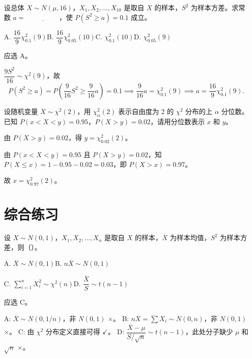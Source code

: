 \documentclass[lang=cn,11pt]{elegantbook}
\begin{document}
\begin{exercise}\label{exer:6-quantile-s2}
设总体 \(X \sim N(\mu, 16)\)，\(X_1, X_2, \dots, X_{10}\) 是取自 \(X\) 的样本，\(S^2\) 为样本方差。求常数 \(a =\,\underline{\hspace{2cm}}\)，使 \(P(S^2 \geq a) = 0.1\) 成立。\par
A. \(\dfrac{16}{9}\chi_{0.1}^2(9)\)\quad B. \(\dfrac{16}{9}\chi_{0.05}^2(10)\)\quad C. \(\chi_{0.1}^2(10)\)\quad D. \(\chi_{0.05}^2(9)\)
\end{exercise}

\begin{solution}
应选 A。

\(\dfrac{9S^2}{16} \sim \chi^2(9)\)，故
\[
P(S^2 \geq a) = P\!\left(\frac{9}{16}S^2 \geq \frac{9}{16}a\right) = 0.1 \implies \frac{9}{16}a = \chi_{0.1}^2(9) \implies a = \frac{16}{9}\chi_{0.1}^2(9).
\]
\end{solution}

\begin{exercise}\label{exer:6-quantile-range}
设随机变量 \(X \sim \chi^2(2)\)，用 \(\chi_\alpha^2(2)\) 表示自由度为 2 的 \(\chi^2\) 分布的上 \(\alpha\) 分位数。已知 \(P(x < X < y) = 0.95\)，\(P(X > y) = 0.02\)，请用分位数表示 \(x\) 和 \(y\)。
\end{exercise}

\begin{solution}
由 \(P(X > y) = 0.02\)，得 \(y = \chi_{0.02}^2(2)\)。

由 \(P(x < X < y) = 0.95\) 且 \(P(X > y) = 0.02\)，知 \(P(X \leq x) = 1 - 0.95 - 0.02 = 0.03\)，即 \(P(X > x) = 0.97\)。

故 \(x = \chi_{0.97}^2(2)\)。
\end{solution}


\section{综合练习}

\begin{exercise}\label{exer:6-multi-normal}
设 \(X \sim N(0,1)\)，\(X_1, X_2, \dots, X_n\) 是取自 \(X\) 的样本，\(\overline{X}\) 为样本均值，\(S^2\) 为样本方差，则（\quad）。\par
A. \(\overline{X} \sim N(0,1)\)\qquad B. \(n\overline{X} \sim N(0,1)\)\par
C. \(\displaystyle\sum_{i=1}^{n}X_i^2 \sim \chi^2(n)\)\qquad D. \(\dfrac{\overline{X}}{S} \sim t(n-1)\)
\end{exercise}

\begin{solution}
应选 C。

A: \(\overline{X} \sim N(0, 1/n)\)，非 \(N(0,1)\) \(\times\)。
B: \(n\overline{X} = \sum X_i \sim N(0, n)\)，非 \(N(0,1)\) \(\times\)。
C: 由 \(\chi^2\) 分布定义直接可得 \(\checkmark\)。
D: \(\dfrac{\overline{X}-\mu}{S/\sqrt{n}} \sim t(n-1)\)，此处分子缺少 \(\mu\) 和 \(\sqrt{n}\) \(\times\)。
\end{solution}
\end{document}
